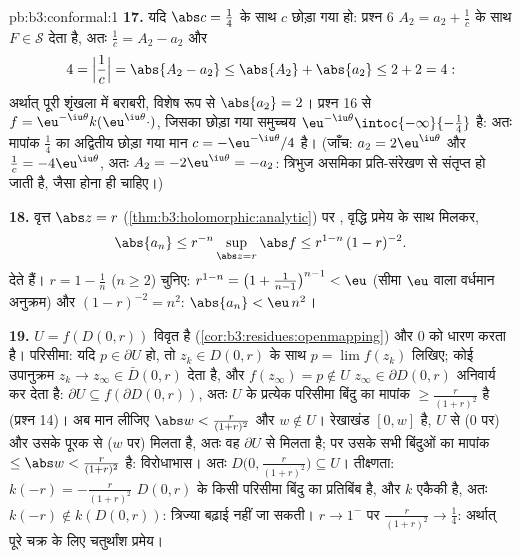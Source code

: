 \begin{solution}{pb:b3:conformal:1}
\textbf{17.} यदि $\abs c = \frac14$ के साथ $c$ छोड़ा गया हो: प्रश्न 6 $A_2 = a_2 +
\frac1c$ के
साथ $F \in \mathcal S$ देता है, अतः $\frac1c = A_2 - a_2$ और
\[
4 = \Bigl|\frac1c\Bigr| = \abs{A_2 - a_2}
\leq \abs{A_2} + \abs{a_2} \leq 2 + 2 = 4 :
\]
अर्थात् पूरी शृंखला में बराबरी, विशेष रूप से $\abs{a_2} = 2$। प्रश्न 16 से
$f = \eu^{-\iu\theta}k(\eu^{\iu\theta}\cdot)$, जिसका छोड़ा गया समुच्चय $\eu^{-\iu\theta}
\intoc{-\infty}{-\frac14}$ है: अतः मापांक $\frac14$ का अद्वितीय
छोड़ा गया मान $c = -\eu^{-\iu\theta}/4$ है। (जाँच: $a_2 = 2\eu^{\iu\theta}$ और $\frac1c = -4\eu^{\iu\theta}$, अतः $A_2 = -2\eu^{\iu\theta} = -a_2$: त्रिभुज
असमिका प्रति-संरेखण से संतृप्त हो जाती है, जैसा होना ही चाहिए।)

\textbf{18.} वृत्त $\abs z =
r$ (\cref{thm:b3:holomorphic:analytic}) पर , वृद्धि प्रमेय के साथ
मिलकर,
\[
\abs{a_n} \leq r^{-n}\sup_{\abs z = r}\abs f
\leq r^{1-n}\,(1 - r)^{-2} .
\] देते हैं। $r = 1 - \frac1n$ ($n \geq
2$) चुनिए: $r^{1-n} = \bigl(1 + \frac1{n-1}\bigr)^{n-1} < \eu$ (सीमा $\eu$ वाला वर्धमान
अनुक्रम) और $(1 - r)^{-2} =
n^2$: $\abs{a_n} < \eu\,n^2$।

\textbf{19.} $U = f(D(0, r))$ विवृत है (\cref{cor:b3:residues:openmapping}) और $0$ को धारण करता है।
परिसीमा: यदि $p \in \partial U$ हो, तो $z_k \in D(0, r)$ के साथ $p = \lim f(z_k)$ लिखिए; कोई उपानुक्रम
$z_k \to z_\infty
\in \bar D(0, r)$ देता है, और $f(z_\infty) = p \notin U$ $z_\infty \in \partial D(0, r)$ अनिवार्य कर देता है: $\partial U \subseteq
f(\partial D(0, r))$, अतः $U$
के प्रत्येक परिसीमा बिंदु का मापांक $\geq \frac r{(1+r)^2}$ है (प्रश्न 14)। अब मान
लीजिए $\abs w < \frac r{(1+r)^2}$ और $w \notin U$। रेखाखंड $[0, w]$  है, $U$ से ($0$ पर)
और उसके पूरक से ($w$ पर) मिलता है, अतः वह $\partial U$ से मिलता है; पर
उसके सभी बिंदुओं का मापांक $\leq \abs w < \frac r{(1+r)^2}$ है: विरोधाभास। अतः $D\bigl(0, \frac r{(1+r)^2}\bigr)
\subseteq U$। तीक्ष्णता:
$k(-r) = -\frac r{(1+r)^2}$ $D(0,r)$ के किसी परिसीमा बिंदु का प्रतिबिंब है, और $k$ एकैकी है,
अतः $k(-r) \notin k(D(0, r))$: त्रिज्या बढ़ाई नहीं जा सकती। $r \to 1^-$ पर $\frac r{(1+r)^2} \to \frac14$: अर्थात् पूरे
चक्र के लिए चतुर्थांश प्रमेय।


\end{solution}
